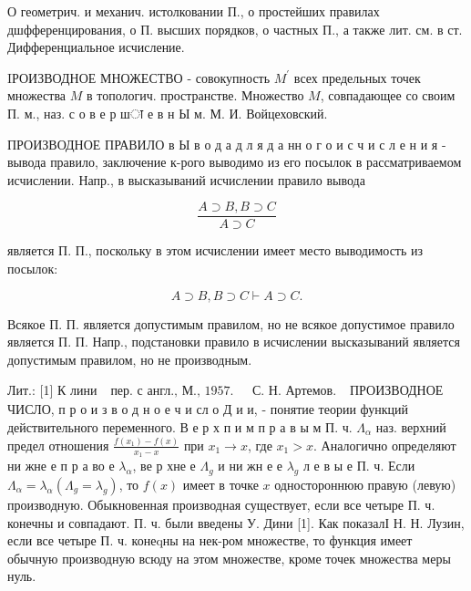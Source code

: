 \documentclass[10pt]{article}
\begin{document}
О геометрич. и механич. истолковании П., о простейших правилах дшфференцирования, о П. высших порядков, о частных П., а также лит. см. в ст. Дифференциальное исчисление.



IРОИЗВОДНОЕ МНОЖЕСТВО - совокупность $M^{\prime}$ всех предельных точек множества $M$ в топологич. пространстве. Множество $M$, совпадающее со своим П. м., наз. с о в е р шा е в н Ы м. М. И. Войцеховский.



ПРОИЗВОДНОЕ ПРАВИЛО в Ы в о д а д л я д а нн о г о и с ч и с л е н и я - вывода правило, заключение к-рого выводимо из его посылок в рассматриваемом исчислении. Напр., в высказываний исчислении правило вывода



\[

\frac{A \supset B, B \supset C}{A \supset C}

\]



является П. П., поскольку в этом исчислении имеет место выводимость из посылок:



\[

A \supset B, B \supset C \vdash A \supset C .

\]



Всякое П. П. является допустимым правилом, но не всякое допустимое правило является П. П. Напр., подстановки правило в исчислении высказываний является допустимым правилом, но не производным.



Лит.: [1] К лини $\begin{array}{ll}\text { пер. с англ., М., 1957. } & \text { С. Н. Артемов. }\end{array}$ ПРОИЗВОДНОЕ ЧИСЛО, п р о и з в о д н о е ч и сл о Д и и, - понятие теории функций действительного переменного. В е р х п и м п р а в ы м П. ч. $\Lambda_{\alpha}$ наз. верхний предел отношения $\frac{f\left(x_{1}\right)-f(x)}{x_{1}-x}$ при $x_{1} \rightarrow x$, где $x_{1}>x$. Аналогично определяют ни жне е п р а во е $\lambda_{\alpha}$, ве р хне е $\Lambda_{g}$ и ни жн е е $\lambda_{g}$ л е в ы е П. ч. Если $\Lambda_{\alpha}=\lambda_{\alpha}\left(\Lambda_{g}=\lambda_{g}\right)$, то $f(x)$ имеет в точке $x$ одностороннюю правую (левую) производную. Обыкновенная производная существует, если все четыре П. ч. конечны и совпадают. П. ч. были введены У. Дини [1]. Как показалІ Н. Н. Лузин, если все четыре П. ч. конеqны на нек-ром множестве, то функция имеет обычную производную всюду на этом множестве, кроме точек множества меры нуль.
\end{document}
